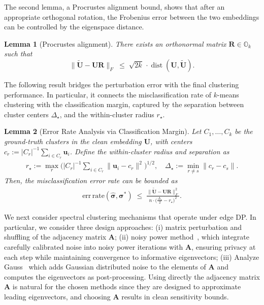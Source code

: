 \documentclass[11pt]{article}
\theoremstyle{plain}
\newtheorem{lemma}{Lemma}[section]
\theoremstyle{definition}
\theoremstyle{remark}
\begin{document}
The second lemma, a Procrustes alignment bound, shows that after an appropriate orthogonal rotation, 
the Frobenius error between the two embeddings can be controlled by the eigenspace distance.

\begin{lemma}[Procrustes alignment]
\label{lem:procrustes}
There exists an orthonormal matrix $\mathbf{R}\in\mathbb{O}_{k}$ such that
\[
\|\widetilde{\mathbf{U}}-\mathbf{U} \mathbf{R}\|_F
\;\le\;
\sqrt{2k}\, \cdot \operatorname{dist}(\mathbf{U},\widetilde{\mathbf{U}}).
\]
\end{lemma}

The following result bridges the perturbation error with the final clustering performance. 
In particular, it connects the misclassification rate of $k$-means clustering with the classification margin, 
captured by the separation between cluster centers $\Delta_\star$, and the within-cluster radius $r_\star$.

\begin{lemma}[Error Rate Analysis via Classification Margin]
\label{lem:kmeans_margin}
Let $C_1,\ldots,C_k$ be the ground-truth clusters in the clean embedding $\mathbf{U}$, with centers 
$c_r := |C_r|^{-1}\sum_{i\in C_r} \mathbf{u}_i$. 
Define the within-cluster radius and separation as
\begin{equation*}
\begin{aligned}
r_\star  := \max_r \Big(|C_r|^{-1}\sum_{i\in C_r}\|\mathbf{u}_i-c_r\|^2\Big)^{1/2}, \quad 
\Delta_\star  := \min_{r\ne s}\|c_r-c_s\|.
\end{aligned}
\end{equation*}
Then, the misclassification error rate can be bounded as 
\begin{equation*}
\begin{aligned}
\mathrm{err\,rate}(\hat{\bm{\sigma}},\bm{\sigma}^\ast)
 \;\le\;
 \frac{\|\widetilde{\mathbf{U}}- \mathbf{U} \mathbf{R}\|^{2}_F}{n \cdot \bigl(\tfrac{\Delta_\star}{2}-r_\star\bigr)^2}.    
\end{aligned}
\end{equation*}
\end{lemma}
We next consider spectral clustering mechanisms that operate under edge DP. 
In particular, we consider three design approaches:
(i) matrix perturbation and shuffling of the adjacency matrix $\mathbf{A}$;
(ii) noisy power method~\citep{hardt2014noisy}, which integrate carefully calibrated noise into noisy power iterations with $\mathbf{A}$, ensuring privacy at each step while maintaining convergence to informative eigenvectors;
(iii) Analyze Gauss~\citep{dwork2014analyze} which adds Gaussian distributed noise to the elements of $\mathbf{A}$ and computes the eigenvectors as post-processing. 
Using directly the adjacency matrix $\mathbf{A}$ is natural for the chosen methods since they are designed to approximate leading eigenvectors, and choosing $\mathbf{A}$ results in clean sensitivity bounds. 
\end{document}
